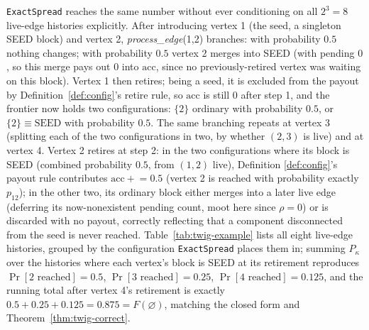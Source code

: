 \documentclass[ijoc,sglanonrev]{informs4}
\begin{document}
\texttt{ExactSpread} reaches the same number without ever conditioning on
all $2^3=8$ live-edge histories explicitly. After introducing vertex 1
(the seed, a singleton SEED block) and vertex 2, \emph{process\_edge}(1,2)
branches: with probability $0.5$ nothing changes; with probability $0.5$
vertex 2 merges into SEED (with pending $0$, so this merge pays out $0$
into $\mathrm{acc}$, since no previously-retired vertex was waiting on this
block). Vertex 1 then retires; being a seed, it is excluded from the
payout by Definition~\ref{def:config}'s retire rule, so $\mathrm{acc}$ is
still $0$ after step 1, and the frontier now holds two configurations:
$\{2\}$ ordinary with probability $0.5$, or $\{2\}\equiv\mathrm{SEED}$ with
probability $0.5$. The same branching repeats at vertex 3 (splitting each
of the two configurations in two, by whether $(2,3)$ is live) and at vertex
4. Vertex 2 retires at step 2: in the two configurations where its block is
SEED (combined probability $0.5$, from $(1,2)$ live), Definition
\ref{def:config}'s payout rule contributes $\mathrm{acc}\mathrel{+}=0.5$
(vertex 2 is reached with probability exactly $p_{12}$); in the other two,
its ordinary block either merges into a later live edge (deferring its
now-nonexistent pending count, moot here since $\rho=0$) or is discarded
with no payout, correctly reflecting that a component disconnected from
the seed is never reached. Table~\ref{tab:twig-example} lists all eight
live-edge histories, grouped by the configuration \texttt{ExactSpread}
places them in; summing $P_\kappa$ over the histories where each vertex's
block is SEED at its retirement reproduces
$\Pr[2\text{ reached}]=0.5$, $\Pr[3\text{ reached}]=0.25$,
$\Pr[4\text{ reached}]=0.125$, and the running total after vertex 4's
retirement is exactly $0.5+0.25+0.125=0.875=F(\varnothing)$, matching the
closed form and Theorem~\ref{thm:twig-correct}.
\end{document}
